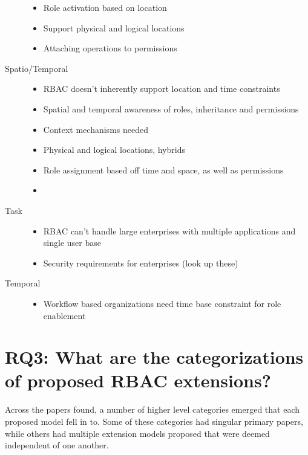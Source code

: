 \documentclass[letterpaper,10pt,english]{sphinxmanual}
\begin{document}
\begin{description}
\begin{itemize}
\item {} 
Role activation based on location

\item {} 
Support physical and logical locations

\item {} 
Attaching operations to permissions

\end{itemize}

\item[{Spatio/Temporal}] \leavevmode\begin{itemize}
\item {} 
RBAC doesn't inherently support location and time constraints

\item {} 
Spatial and temporal awareness of roles, inheritance and permissions

\item {} 
Context mechanisms needed

\item {} 
Physical and logical locations, hybrids

\item {} 
Role assignment based off time and space, as well as permissions

\item {} 
\end{itemize}

\item[{Task}] \leavevmode\begin{itemize}
\item {} 
RBAC can't handle large enterprises with multiple applications and single user base

\item {} 
Security requirements for enterprises (look up these)

\end{itemize}

\item[{Temporal}] \leavevmode\begin{itemize}
\item {} 
Workflow based organizations need time base constraint for role enablement

\end{itemize}

\end{description}


\chapter{RQ3: What are the categorizations of proposed RBAC extensions?}
\label{research_questions/RQ_3:rq3-what-are-the-categorizations-of-proposed-rbac-extensions}\label{research_questions/RQ_3::doc}
Across the papers found, a number of higher level categories emerged that each proposed model fell in to.  Some of these categories had singular primary papers, while others had multiple extension models proposed that were deemed independent of one another.
\end{document}
